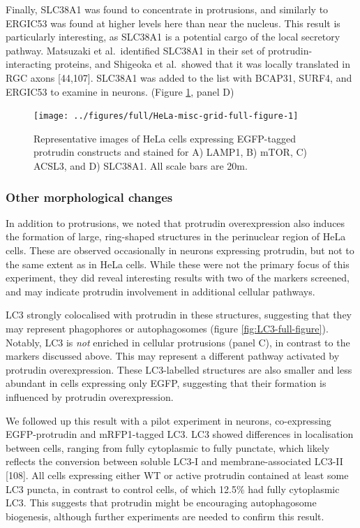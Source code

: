 \documentclass[
  12pt,
  a4paper,
]{book}
\begin{document}
Finally, SLC38A1 was found to concentrate in protrusions, and similarly to ERGIC53 was found at higher levels here than near the nucleus. This result is particularly interesting, as SLC38A1 is a potential cargo of the local secretory pathway. Matsuzaki et al.~identified SLC38A1 in their set of protrudin-interacting proteins, and Shigeoka et al.~showed that it was locally translated in RGC axons {[}44,107{]}. SLC38A1 was added to the list with BCAP31, SURF4, and ERGIC53 to examine in neurons. (Figure \ref{fig:HeLa-misc-grid-full-figure}, panel D)

\begin{figure}
\texttt{[image: ../figures/full/HeLa-misc-grid-full-figure-1]} \caption[Protrudin-expressing HeLa cells stained for LAMP1, mTOR, ACSL3, and SLC38A1]{Representative images of HeLa cells expressing EGFP-tagged protrudin constructs and stained  for A) LAMP1, B) mTOR, C) ACSL3, and D) SLC38A1.  All scale bars are 20\textmu{}m.}\label{fig:HeLa-misc-grid-full-figure}
\end{figure}

\hypertarget{other-morphological-changes}{%
\subsubsection{Other morphological changes}\label{other-morphological-changes}}

In addition to protrusions, we noted that protrudin overexpression also induces the formation of large, ring-shaped structures in the perinuclear region of HeLa cells. These are observed occasionally in neurons expressing protrudin, but not to the same extent as in HeLa cells. While these were not the primary focus of this experiment, they did reveal interesting results with two of the markers screened, and may indicate protrudin involvement in additional cellular pathways.

LC3 strongly colocalised with protrudin in these structures, suggesting that they may represent phagophores or autophagosomes (figure \ref{fig:LC3-full-figure}). Notably, LC3 is \emph{not} enriched in cellular protrusions (panel C), in contrast to the markers discussed above. This may represent a different pathway activated by protrudin overexpression. These LC3-labelled structures are also smaller and less abundant in cells expressing only EGFP, suggesting that their formation is influenced by protrudin overexpression.

We followed up this result with a pilot experiment in neurons, co-expressing EGFP-protrudin and mRFP1-tagged LC3. LC3 showed differences in localisation between cells, ranging from fully cytoplasmic to fully punctate, which likely reflects the conversion between soluble LC3-I and membrane-associated LC3-II {[}108{]}. All cells expressing either WT or active protrudin contained at least some LC3 puncta, in contrast to control cells, of which 12.5\% had fully cytoplasmic LC3. This suggests that protrudin might be encouraging autophagosome biogenesis, although further experiments are needed to confirm this result.
\end{document}
